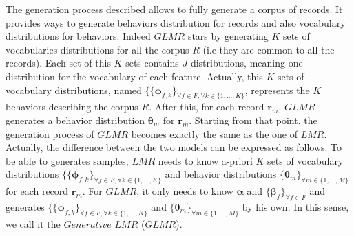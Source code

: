 The generation process described allows to fully generate a corpus of records. It provides ways to generate behaviors distribution for records and also vocabulary distributions for behaviors. Indeed $GLMR$ stars by generating $K$ sets of vocabularies distributions for all the corpus $R$ (i.e they are common to all the records). Each set of this $K$ sets contains $J$ distributions, meaning one distribution for the vocabulary of each feature. Actually, this $K$ sets of vocabulary distributions, named $\{\{\boldsymbol{\phi }_{f,k}\}_{\forall f \in F, \forall k\in\{1,...,K\}}$, represents the $K$ behaviors describing the corpus $R$. After this, for each record $\mathbf{r}_{m}$, $GLMR$ generates a behavior distribution $\boldsymbol{\theta}_{m}$ for $\mathbf{r}_{m}$. Starting from that point, the generation process of $GLMR$ becomes exactly the same as the one of $LMR$. Actually, the difference between the two models can be expressed as follows. To be able to generates samples, $LMR$ needs to know a-priori $K$ sets of vocabulary distributions $\{\{\boldsymbol{\phi }_{f,k}\}_{\forall f \in F, \forall k\in\{1,...,K\}}$ and behavior distributions $\{\boldsymbol{\theta}_{m}\}_{\forall m\in \{1,...,M\}}$ for each record $\mathbf{r}_{m}$. For $GLMR$, it only needs to know $\boldsymbol{\alpha}$ and $\{\boldsymbol{\beta }_{f}\}_{\forall f\in F}$ and generates $\{\{\boldsymbol{\phi }_{f,k}\}_{\forall f \in F, \forall k\in\{1,...,K\}}$  and $\{\boldsymbol{\theta}_{m}\}_{\forall m\in \{1,...,M\}}$ by his own. In this sense, we call it the $Generative$ $LMR$ ($GLMR$). \par

